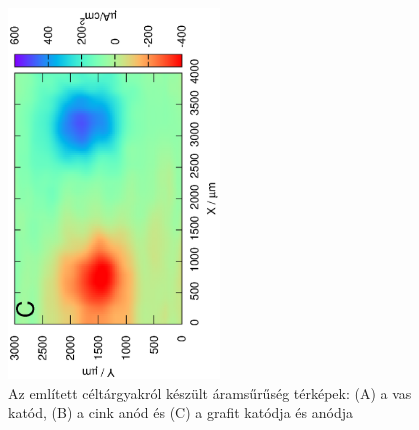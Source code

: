\begin{figure}
\includegraphics[width=0.5\textwidth, angle=-90]{img/mérések/grafit_h_100.eps}

\caption{Az említett céltárgyakról készült áramsűrűség térképek:
(A) a vas katód, (B) a cink anód és (C) a grafit katódja és anódja}
\label{fig:áramsűrűség}
\end{figure}
